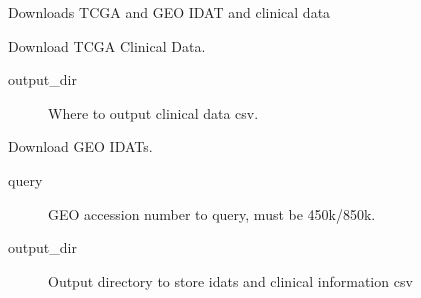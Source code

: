 \documentclass[letterpaper,10pt,english]{sphinxmanual}
\begin{document}
\begin{fulllineitems}
\label{\detokenize{index:pymethylprocess.PreProcessDataTypes.TCGADownloader}}
Downloads TCGA and GEO IDAT and clinical data

\begin{fulllineitems}
\label{\detokenize{index:pymethylprocess.PreProcessDataTypes.TCGADownloader.download_clinical}}
Download TCGA Clinical Data.
\begin{description}
\item[{output\_dir}] \leavevmode
Where to output clinical data csv.

\end{description}

\end{fulllineitems}


\begin{fulllineitems}
\label{\detokenize{index:pymethylprocess.PreProcessDataTypes.TCGADownloader.download_geo}}
Download GEO IDATs.
\begin{description}
\item[{query}] \leavevmode
GEO accession number to query, must be 450k/850k.

\item[{output\_dir}] \leavevmode
Output directory to store idats and clinical information csv

\end{description}

\end{fulllineitems}



\end{fulllineitems}
\end{document}
